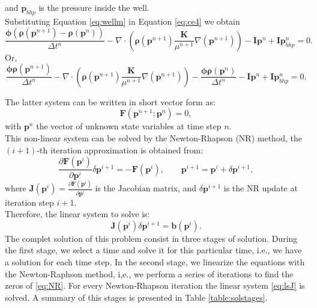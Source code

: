 \documentclass[12pt]{article}
\numberwithin{equation}{section}
\begin{document}
and $\mathbf{p}_{bhp}$ is the pressure inside the well. \\
Substituting Equation \ref{eq:wellm} in Equation \ref{eq:ce4} we obtain 
\begin{equation}\label{eq:ce5}
 \frac{\mathbf{\phi}(\mathbf{\rho}(\mathbf{p}^{n+1})
 -\mathbf{\rho}(\mathbf{p}^{n}))}{\Delta t^n}
 -\nabla \cdot (\mathbf{\rho}(\mathbf{p}^{n+1}) 
 \frac{\mathbf{K}}{\mu^{n+1}}\nabla(\mathbf{p}^{n+1}))-\mathbf{I}\mathbf{p}^{n}+\mathbf{I}\mathbf{p}_{bhp}^{n}=0.
\end{equation}
Or,
\begin{equation}\label{eq:ce6}
 \frac{\mathbf{\phi}\mathbf{\rho}(\mathbf{p}^{n+1}
 )}{\Delta t^n}-\nabla \cdot (\mathbf{\rho}(\mathbf{p}^{n+1}) 
 \frac{\mathbf{K}}{\mu^{n+1}}\nabla(\mathbf{p}^{n+1}))
 -\frac{\mathbf{\phi}\mathbf{\rho}(\mathbf{p}^{n})}{\Delta t^n}
 -\mathbf{I}\mathbf{p}^{n}+\mathbf{I}\mathbf{p}_{bhp}^{n}=0.
\end{equation}

The latter system can be written in short vector form as:
\begin{equation}\label{eq:NR}
 \mathbf{F}(\mathbf{p}^{n+1};\mathbf{p}^n)=0,
\end{equation}
with $\mathbf{p}^n$ the vector of unknown state variables at time step $n$.\\
This non-linear system can be solved by the Newton-Rhapson (NR) method, the $(i+1)$-th iteration approximation is obtained from:
$$\frac{\partial \mathbf{F}(\mathbf{p}^i)}{\partial \mathbf{p}^i}\delta\mathbf{p}^{i+1}=-\mathbf{F}(\mathbf{p}^i),
\qquad \mathbf{p}^{i+1}=\mathbf{p}^i+\delta \mathbf{p}^{i+1},$$
where $\mathbf{J}(\mathbf{p}^i)=\frac{\partial \mathbf{F}(\mathbf{p}^i)}{\partial \mathbf{p}^i}$ is the 
Jacobian matrix, and $\delta \mathbf{p}^{i+1}$ is the NR update at iteration step $i+1$.\\
Therefore, the linear system to solve is:\\
\begin{equation}\label{eq:lsJ}
\mathbf{J}(\mathbf{p}^i)\delta \mathbf{p}^{i+1}=\mathbf{b}(\mathbf{p}^i).
\end{equation}
The complet solution of this problem consist in three stages of solution. During the first stage,  we select a time and solve it for this particular time, i.e., we have a solution for each time step. In the second stage, we linearize the equations with the Newton-Raphson method, i,e., we perform a series of iterations to find the zeros of \eqref{eq:NR}. For every Newton-Rhapson iteration the linear system \eqref{eq:lsJ} is solved. A summary of this stages is presented in Table \ref{table:solstages}.
\end{document}
